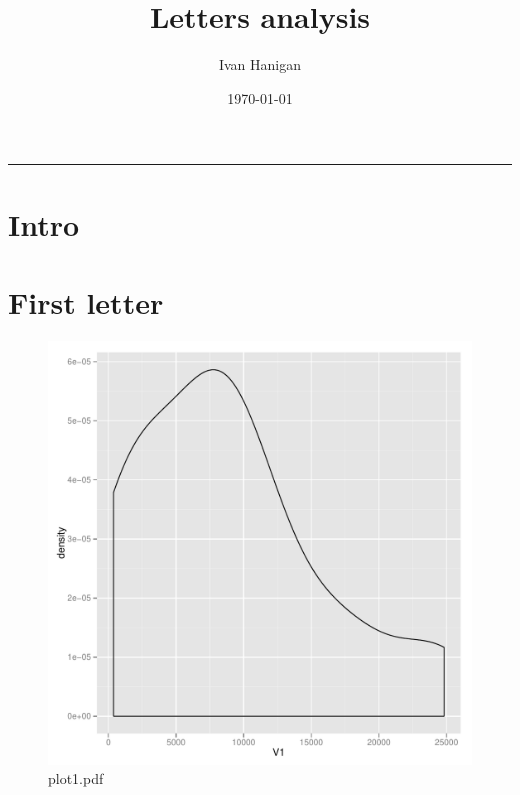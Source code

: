\documentclass[a4paper]{article}
\title{Letters analysis}
\author{Ivan Hanigan}
\date{\today}
\begin{document}
\maketitle

\setcounter{tocdepth}{3}
\tableofcontents
\vspace*{1cm}
\hrule

\section{Intro}
\clearpage
\section{First letter}
\begin{figure}[!h]
\centering
\includegraphics[width=\textwidth]{plot1.pdf}
\caption{plot1.pdf}
\label{fig:plot1.pdf}
\end{figure}
\clearpage
\end{document}
